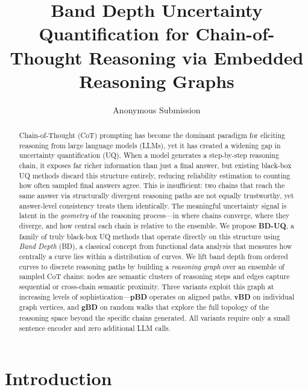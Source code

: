 \documentclass[letterpaper]{article} %
\title{Band Depth Uncertainty Quantification for Chain-of-Thought Reasoning via Embedded Reasoning Graphs}
\author{
    Anonymous Submission
}
\begin{document}
\maketitle

\begin{abstract}
Chain-of-Thought (CoT) prompting has become the dominant paradigm for eliciting
reasoning from large language models (LLMs), yet it has created a widening gap
in uncertainty quantification (UQ). When a model generates a step-by-step
reasoning chain, it exposes far richer information than just a final answer, but
existing black-box UQ methods discard this structure entirely, reducing
reliability estimation to counting how often sampled final answers agree. This
is insufficient: two chains that reach the same answer via structurally
divergent reasoning paths are not equally trustworthy, yet answer-level
consistency treats them identically. The meaningful uncertainty signal is latent
in the \emph{geometry} of the reasoning process---in where chains converge, where
they diverge, and how central each chain is relative to the ensemble. We propose
\textbf{BD-UQ}, a family of truly black-box UQ methods that operate directly on
this structure using \emph{Band Depth} (BD), a classical concept from functional
data analysis that measures how centrally a curve lies within a distribution of
curves. We lift band depth from ordered curves to discrete reasoning paths by
building a \emph{reasoning graph} over an ensemble of sampled CoT chains: nodes
are semantic clusters of reasoning steps and edges capture sequential or
cross-chain semantic proximity. Three variants exploit this graph at increasing
levels of sophistication---\textbf{pBD} operates on aligned paths, \textbf{vBD}
on individual graph vertices, and \textbf{gBD} on random walks that explore the
full topology of the reasoning space beyond the specific chains generated. All
variants require only a small sentence encoder and zero additional LLM calls.
\end{abstract}

\section{Introduction}
\label{sec:intro}
\end{document}
